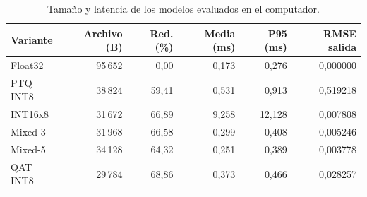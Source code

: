 \begin{table}[H]
\centering\small
\caption{Tamaño y latencia de los modelos evaluados en el computador.}\label{tab:rx_recursos}
\begin{tabularx}{\linewidth}{Yrrrrr}\toprule
Variante & Archivo (B) & Red. (\%) & Media (ms) & P95 (ms) & RMSE salida\\\midrule
Float32 & 95\,652 & 0,00 & 0,173 & 0,276 & 0,000000\\
PTQ INT8 & 38\,824 & 59,41 & 0,531 & 0,913 & 0,519218\\
INT16x8 & 31\,672 & 66,89 & 9,258 & 12,128 & 0,007808\\
Mixed-3 & 31\,968 & 66,58 & 0,299 & 0,408 & 0,005246\\
Mixed-5 & 34\,128 & 64,32 & 0,251 & 0,389 & 0,003778\\
QAT INT8 & 29\,784 & 68,86 & 0,373 & 0,466 & 0,028257\\
\bottomrule\end{tabularx}
\end{table}
